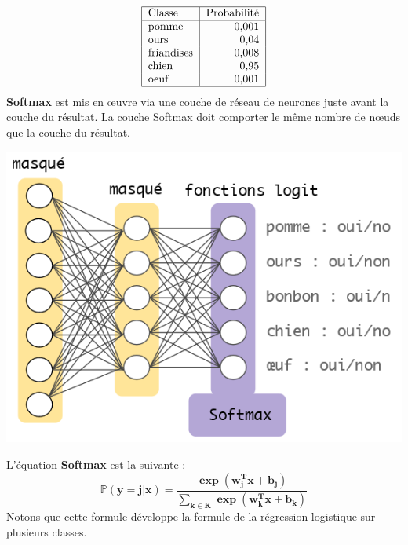\documentclass[french]{article}
\begin{document}
$$\begin{tabular}{| l |  r | }
	\hline			
	Classe & Probabilité \\
	\hline
	pomme & 0,001 \\
	ours & 0,04 \\
	friandises & 0,008 \\
	chien & 0,95 \\
	oeuf & 0,001 \\
	\hline  
\end{tabular}$$
\newpage
\textbf{Softmax} est mis en œuvre via une couche de réseau de neurones juste avant la couche du résultat. La couche Softmax doit comporter le même nombre de nœuds que la couche du résultat.
\begin{center}
	\includegraphics{./Capture_2.png} 
\end{center}
L'équation \textbf{Softmax} est la suivante : 
$$\bm{
	\mathbb{P}(y=j|x)=
	\frac{\exp(w_{j}^{T}x+b_{j})}
		{\sum_{k\in K}\exp(w_{k}^{T}x+b_{k})}
}$$
Notons que cette formule développe la formule de la régression logistique sur plusieurs classes.
\end{document}

